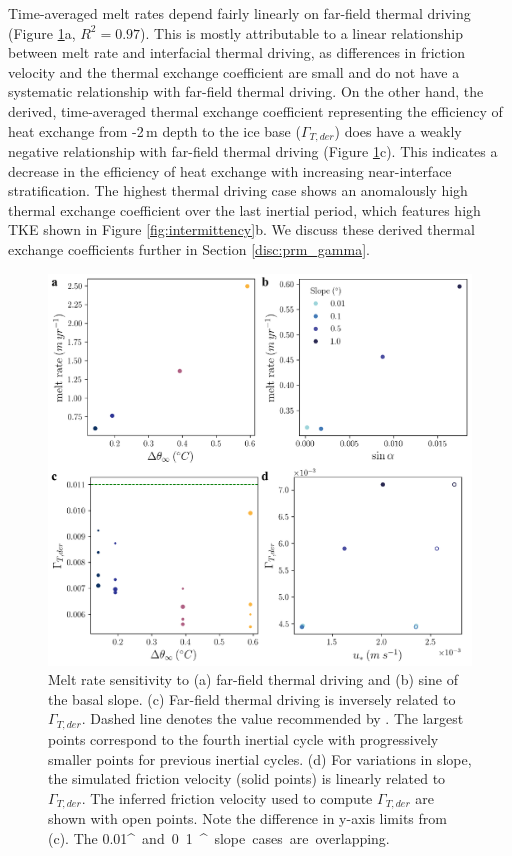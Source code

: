 \documentclass[tc, manuscript]{copernicus}
\begin{document}
Time-averaged melt rates depend fairly linearly on far-field thermal driving (Figure \ref{fig:melt_sensitivity}a, $R^2=0.97$). This is mostly attributable to a linear relationship between melt rate and interfacial thermal driving, as differences in friction velocity and the thermal exchange coefficient are small and do not have a systematic relationship with far-field thermal driving. On the other hand, the derived, time-averaged thermal exchange coefficient representing the efficiency of heat exchange from -2\,\unit{m} depth to the ice base ($\Gamma_{T,der}$) does have a weakly negative relationship with far-field thermal driving (Figure \ref{fig:melt_sensitivity}c). This indicates a decrease in the efficiency of heat exchange with increasing near-interface stratification. The highest thermal driving case shows an anomalously high thermal exchange coefficient over the last inertial period, which features high TKE shown in Figure \ref{fig:intermittency}b. We discuss these derived thermal exchange coefficients further in Section \ref{disc:prm_gamma}.

\begin{figure}[t]
\includegraphics[width=12cm]{fig7.pdf}
\caption{Melt rate sensitivity to (a) far-field thermal driving and (b) sine of the basal slope. (c) Far-field thermal driving is inversely related to $\Gamma_{T,der}$. Dashed line denotes the value recommended by \citet{jenkins_observation_2010}. The largest points correspond to the fourth inertial cycle with progressively smaller points for previous inertial cycles. (d) For variations in slope, the simulated friction velocity (solid points) is linearly related to $\Gamma_{T,der}$. The inferred friction velocity used to compute $\Gamma_{T,der}$ are shown with open points. Note the difference in y-axis limits from (c). The 0.01\unit{^{\circ}} and 0.1\unit{^{\circ}} slope cases are overlapping.}
\label{fig:melt_sensitivity}
\end{figure}
\end{document}
